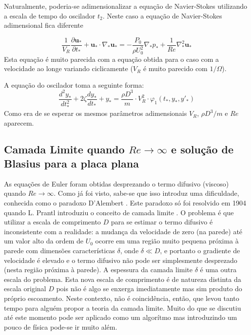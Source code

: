 \documentclass[article,12pt,oneside,a4paper,english,brazil,sumario=tradicional]{abntex2}
\newcommand{\p}[1]{\ensuremath{ \mathbf{#1}}}    %
\newcommand{\lra}{\ensuremath{\longrightarrow}}
\newcommand{\pd}{\ensuremath{\partial}}
\begin{document}
Naturalmente, poderia-se adimensionalizar a equação de Navier-Stokes utilizando a escala de tempo do oscilador $t_2$. Neste caso a equação de Navier-Stokes adimensional fica diferente 

\[
\frac{1}{V_R}\frac{\pd\p{u}_*}{\pd t_*} + \p{u}_*\cdot\nabla_*\p{u_*} = -\frac{P_0}{\rho U_0^2}\nabla_* p_* + \frac{1}{Re}\nabla_*^2\p{u}_* 
\]
Esta equação é muito parecida com a equação obtida para o caso com a velocidade ao longe variando ciclicamente ($V_R$ é muito parecido com $1/\Omega$). 

A equação do oscilador toma a seguinte forma:
\[
\frac{d^2y_*}{dt_*^2} + 2\zeta\frac{dy_*}{dt_*} + y_* = \frac{\rho D^3}{m} \cdot V_R^2 \cdot \varphi_1\left(t_*, y_*, y'_*\right)
\]
Como era de se esperar os mesmos parâmetros adimensionais $V_R$, $\rho D^3/m$ e $Re$ aparecem.

\subsection{Camada Limite quando $Re\lra\infty$ e solução de Blasius para a placa plana}

As equações de Euler foram obtidas desprezando o termo difusivo (viscoso) quando $Re\lra\infty$. Como já foi visto,  sabe-se que isso introduz uma dificuldade, conhecida como o paradoxo D'Alembert \cite{Birkhoff60}. Este paradoxo só foi resolvido em 1904 quando L. Prantl introduziu  o conceito de camada limite \cite{Birkhoff60}. O problema é que utilizar a escala de comprimento $D$ para se estimar o termo difusivo é inconsistente com a realidade: a mudança da velocidade de zero (na parede) até um valor alto da ordem de $U_0$ ocorre em uma região muito pequena próxima à parede com dimensões características $\delta$, onde $\delta \ll D$, e portanto o  gradiente de velocidade é elevado e o termo difusivo não pode ser simplesmente desprezado (nesta região próxima à parede). A espessura da camada limite $\delta$ é uma outra escala do problema. Esta nova escala de comprimento é de natureza distinta da escala original $D$ pois não é algo se enxerga imediatamente mas sim produto do próprio escoamento. Neste contexto,  não é coincidência, então, que levou tanto tempo para alguém propor a teoria da camada limite. Muito do que se discutiu até este momento pode ser aplicado como um algorítmo mas introduzindo um pouco de física pode-se ir muito além.
\end{document}
